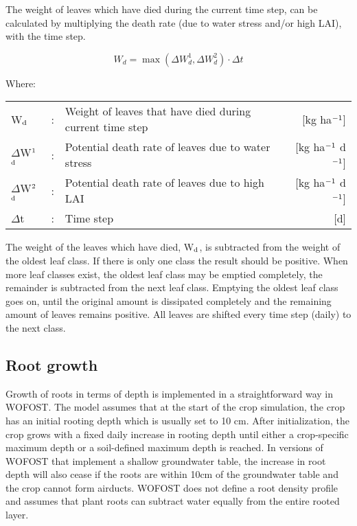 The weight of leaves which have died during the current time step, can be calculated by
multiplying the death rate (due to water stress and/or high LAI), with the time step.

\begin{equation}
W_{d} = \max(\Delta W_{d}^{1} , \Delta W_{d}^{2})\cdot \Delta t
\end{equation}

Where:\\[5pt]
\begin{tabularx}{\textwidth}{llXr}
	W$_{{\rm d}}$ &:& Weight of leaves that have died during 
	current time step    &    [kg ha$^{{\rm -1}}$]\\
	$\Delta$W$^{{\rm 1}}$$_{{\rm d}}$ &:& Potential death rate of leaves due 
	to water stress   &      [kg ha$^{{\rm -1}}$ d$^{{\rm -1}}$]\\
	$\Delta$W$^{{\rm 2}}$$_{{\rm d}}$ &:& Potential death rate of leaves due to 
	high LAI   &     [kg ha$^{{\rm -1}}$ d$^{{\rm -1}}$]\\
	$\Delta$t &:& Time step    &    [d]\\
\end{tabularx}

The weight of the leaves which have died, W$_{{\rm d}}$, is subtracted from the weight of the oldest
leaf class. If there is only one class the result should be positive. When more leaf classes
exist, the oldest leaf class may be emptied completely, the remainder is subtracted from
the next leaf class. Emptying the oldest leaf class goes on, until the original amount is
dissipated completely and the remaining amount of leaves remains positive. All leaves are
shifted every time step (daily) to the next class.

\subsection{Root growth}
\label{sec:rootgrowth}

Growth of roots in terms of depth is implemented in a straightforward way in WOFOST. 
The model assumes that at the start of the crop simulation, the crop has an initial rooting 
depth which is usually set to 10 cm. After initialization, the crop grows with a fixed daily 
increase in rooting depth until either a crop-specific maximum depth or a soil-defined maximum 
depth is reached. In versions of WOFOST that implement a shallow groundwater table, the 
increase in root depth will also cease if the roots are within 10cm of the groundwater 
table and the crop cannot form airducts. WOFOST does not define a root density profile 
and assumes that plant roots can subtract water equally from the entire rooted layer.

